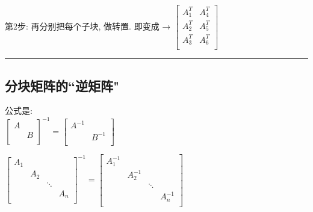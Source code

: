 \documentclass[UTF8]{ctexart}
\begin{document}
第2步: 再分别把每个子块, 做转置. 即变成 → $
\left[ \begin{array}{c|c}
	A_1^T&		A_4^T\\
	A_2^T&		A_5^T\\
	A_3^T&		A_6^T\\
\end{array} \right] 
$ \\

\hrule


\subsection{分块矩阵的``逆矩阵"}

公式是: \\

$
\left[ \begin{matrix}
	A&		\\
	&		B\\
\end{matrix} \right] ^{-1}=\left[ \begin{matrix}
	A^{-1}&		\\
	&		B^{-1}\\
\end{matrix} \right] 
$ \\
\vspace{1em} 

$
\left[ \begin{matrix}
	A_1&		&		&		\\
	&		A_2&		&		\\
	&		&		\ddots&		\\
	&		&		&		A_n\\
\end{matrix} \right] ^{-1}=\left[ \begin{matrix}
	A_1^{-1}&		&		&		\\
	&		A_2^{-1}&		&		\\
	&		&		\ddots&		\\
	&		&		&		A_n^{-1}\\
\end{matrix} \right] 
$\\
\end{document}
